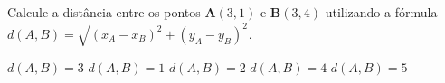 Calcule a distância entre os pontos $\mathbf{A}(3, 1)$ e $\mathbf{B}(3, 4)$ utilizando a fórmula $d(A,B)=\sqrt{(x_A-x_B)^2+(y_A-y_B)^2}$.

$d(A,B)=3$
$d(A,B)=1$
$d(A,B)=2$
$d(A,B)=4$
$d(A,B)=5$



